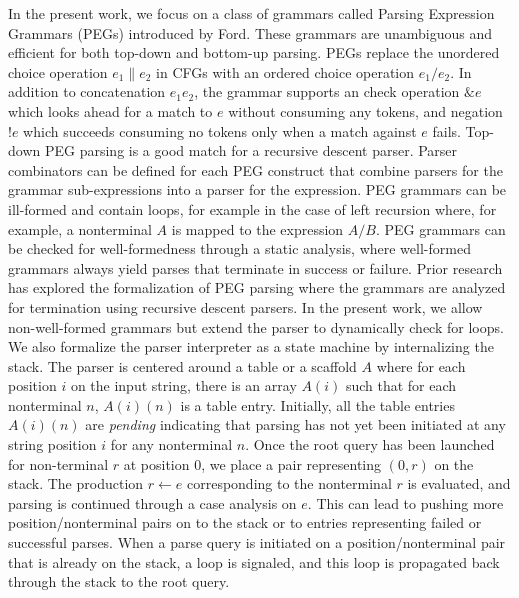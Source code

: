 \documentclass[sigplan,10pt,anonymous,review]{acmart}\settopmatter{printfolios=true,printccs=false,printacmref=false}
\begin{document}
\begin{CCSXML}
In the present work, we focus on a class of grammars called Parsing
Expression Grammars (PEGs) introduced by Ford.  These grammars are
unambiguous and efficient for both top-down and bottom-up parsing.
PEGs replace the unordered choice operation $e_1 \| e_2$ in CFGs with
an ordered choice operation $e_1/e_2$\@.  In addition to concatenation
$e_1 e_2$, the grammar supports an check operation $\& e$ which looks
ahead for a match to $e$ without consuming any tokens, and negation
$!e$ which succeeds consuming no tokens only when a match against $e$
fails.  Top-down PEG parsing is a good match for a recursive descent
parser.  Parser combinators can be defined for each PEG construct that
combine parsers for the grammar sub-expressions into a parser for the
expression.  PEG grammars can be ill-formed and contain loops, for
example in the case of left recursion where, for example, a
nonterminal $A$ is mapped to the expression $A/B$\@.  PEG grammars can
be checked for well-formedness through a static analysis, where
well-formed grammars always yield parses that terminate in success or
failure.  Prior research has explored the formalization of PEG parsing
where the grammars are analyzed for termination using recursive
descent parsers.  In the present work, we allow non-well-formed
grammars but extend the parser to dynamically check for loops.  We
also formalize the parser interpreter as a state machine by
internalizing the stack. The parser is centered around a table or a
scaffold $A$ where for each position $i$ on the input string, there is
an array $A(i)$ such that for each nonterminal $n$, $A(i)(n)$ is a
table entry.  Initially, all the table entries $A(i)(n)$ are
\emph{pending} indicating that parsing has not yet been initiated at
any string position $i$ for any nonterminal $n$\@.  Once the root
query has been launched for non-terminal $r$ at position $0$, we place
a pair representing $(0, r)$ on the stack.  The production
$r \leftarrow e$ corresponding to the nonterminal $r$ is evaluated,
and parsing is continued through a case analysis on $e$.  This can
lead to pushing more position/nonterminal pairs on to the stack or to
entries representing failed or successful parses.  When a parse query
is initiated on a position/nonterminal pair that is already on the
stack, a loop is signaled, and this loop is propagated back through
the stack to the root query.


\end{CCSXML}
\end{document}
